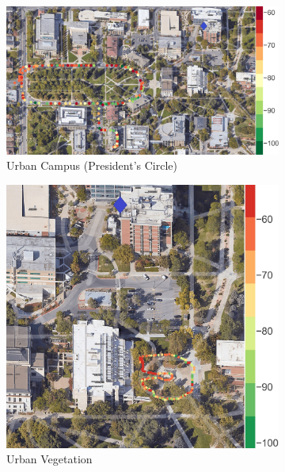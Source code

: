 \documentclass[12pt, draftcls, onecolumn]{IEEEtran}
\begin{document}
\begin{figure} [t]
     \centering
     \begin{subfigure}{0.460\linewidth}
         \centering
         \includegraphics[width=1.0\linewidth]{figs/rx_urban_campus.jpg}
         \caption{Urban Campus (President's Circle)}
         \label{F5a}
     \end{subfigure}
     \begin{subfigure}{0.2579\linewidth}
         \centering
         \includegraphics[width=1.0\linewidth]{figs/rx_urban_vegetation.jpg}
         \caption{Urban Vegetation}
         \label{F5b}
     \end{subfigure}
     \begin{subfigure}{0.2579\linewidth}

\end{subfigure}
\end{figure}
\end{document}
